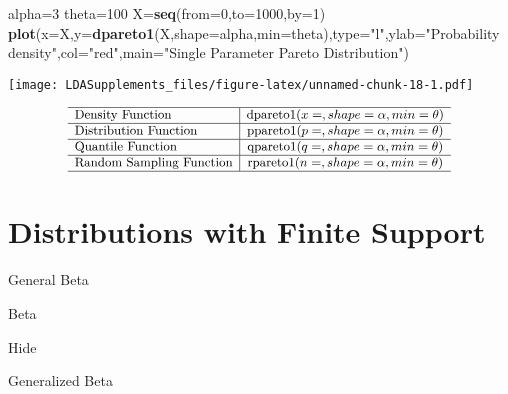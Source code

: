 \documentclass[]{book}
\newenvironment{Shaded}{\begin{snugshade}}{\end{snugshade}}
\newcommand{\KeywordTok}[1]{\textcolor[rgb]{0.13,0.29,0.53}{\textbf{#1}}}
\newcommand{\DataTypeTok}[1]{\textcolor[rgb]{0.13,0.29,0.53}{#1}}
\newcommand{\DecValTok}[1]{\textcolor[rgb]{0.00,0.00,0.81}{#1}}
\newcommand{\StringTok}[1]{\textcolor[rgb]{0.31,0.60,0.02}{#1}}
\newcommand{\NormalTok}[1]{#1}
\begin{document}
\begin{Shaded}
\begin{Highlighting}[]
\NormalTok{alpha=}\DecValTok{3}
\NormalTok{theta=}\DecValTok{100}
\NormalTok{X=}\KeywordTok{seq}\NormalTok{(}\DataTypeTok{from=}\DecValTok{0}\NormalTok{,}\DataTypeTok{to=}\DecValTok{1000}\NormalTok{,}\DataTypeTok{by=}\DecValTok{1}\NormalTok{)}
\KeywordTok{plot}\NormalTok{(}\DataTypeTok{x=}\NormalTok{X,}\DataTypeTok{y=}\KeywordTok{dpareto1}\NormalTok{(X,}\DataTypeTok{shape=}\NormalTok{alpha,}\DataTypeTok{min=}\NormalTok{theta),}\DataTypeTok{type=}\StringTok{"l"}\NormalTok{,}\DataTypeTok{ylab=}\StringTok{"Probability density"}\NormalTok{,}\DataTypeTok{col=}\StringTok{"red"}\NormalTok{,}\DataTypeTok{main=}\StringTok{"Single Parameter Pareto Distribution"}\NormalTok{)}
\end{Highlighting}
\end{Shaded}

\texttt{[image: LDASupplements\_files/figure-latex/unnamed-chunk-18-1.pdf]}

\[
{\small
\begin{matrix}
\begin{array}{l|c}
\hline
  \text{Density Function} & \text{dpareto1}(x=, shape=\alpha,min=\theta) \\
\hline
  \text{Distribution Function} & \text{ppareto1}(p=, shape=\alpha,min=\theta) \\
\hline
  \text{Quantile Function} & \text{qpareto1}(q=, shape=\alpha,min=\theta) \\ 
\hline
  \text{Random Sampling Function} & \text{rpareto1}(n=, shape=\alpha,min=\theta) \\
\hline
\end{array}
\end{matrix}
}
\]

\section{Distributions with Finite
Support}\label{distributions-with-finite-support}

General Beta

Beta

\hypertarget{fsA}{}
{Hide}

Generalized Beta
\end{document}
